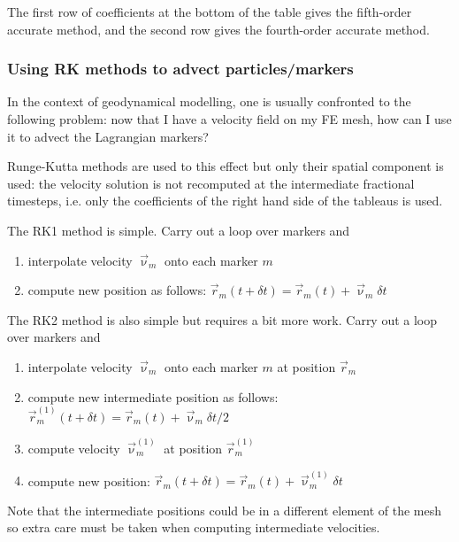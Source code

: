The first row of coefficients at the bottom of the table gives the fifth-order accurate method, and the second row gives the fourth-order accurate method. 

\Literature \cite{fehl85,hanw93,dopr80,dopr86,prdo81}

\subsubsection{Using RK methods to advect particles/markers \label{sec:rkparticles}}

In the context of geodynamical modelling, one is usually confronted to the following problem:
now that I have a velocity field on my FE mesh, how can I use it to advect the Lagrangian 
markers?

Runge-Kutta methods are used to this effect but only their spatial component is used:
the velocity solution is not recomputed at the intermediate fractional timesteps, i.e. 
only the coefficients of the right hand side of the tableaus is used.

The RK1 method is simple. Carry out a loop over markers and 
\begin{enumerate}
\item interpolate velocity $\vec\upnu_{m}$ onto each marker $m$
\item compute new position as follows: $\vec r_m(t+\delta t)=\vec r_m(t) + \vec\upnu_m \delta t$
\end{enumerate}

The RK2 method is also simple but requires a bit more work. Carry out a loop over markers and 
\begin{enumerate}
\item interpolate velocity $\vec\upnu_{m}$ onto each marker $m$ at position $\vec r_m$
\item compute new intermediate position as follows: $\vec r_m^{(1)}(t+\delta t)=\vec r_m(t) + \vec\upnu_m \delta t/2$
\item compute velocity $\vec\upnu_{m}^{(1)}$ at position $\vec r_m^{(1)}$
\item compute new position: $\vec r_m(t+\delta t)=\vec r_m(t) + \vec\upnu_m^{(1)} \delta t$ 
\end{enumerate}
Note that the intermediate positions could be in a different element of the mesh so extra care must be taken when 
computing intermediate velocities. 

